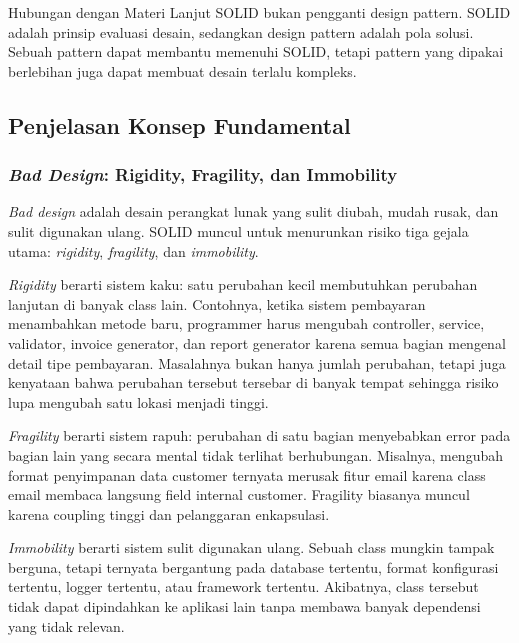 \begin{cmt}{Hubungan dengan Materi Lanjut}{}
SOLID bukan pengganti design pattern. SOLID adalah prinsip evaluasi desain, sedangkan design pattern adalah pola solusi. Sebuah pattern dapat membantu memenuhi SOLID, tetapi pattern yang dipakai berlebihan juga dapat membuat desain terlalu kompleks.
\end{cmt}

\subsection{Penjelasan Konsep Fundamental}

\subsubsection{\textit{Bad Design}: Rigidity, Fragility, dan Immobility}

\begin{jawab}
\textit{Bad design} adalah desain perangkat lunak yang sulit diubah, mudah rusak, dan sulit digunakan ulang. SOLID muncul untuk menurunkan risiko tiga gejala utama: \textit{rigidity}, \textit{fragility}, dan \textit{immobility}.
\end{jawab}

\textit{Rigidity} berarti sistem kaku: satu perubahan kecil membutuhkan perubahan lanjutan di banyak class lain. Contohnya, ketika sistem pembayaran menambahkan metode baru, programmer harus mengubah controller, service, validator, invoice generator, dan report generator karena semua bagian mengenal detail tipe pembayaran. Masalahnya bukan hanya jumlah perubahan, tetapi juga kenyataan bahwa perubahan tersebut tersebar di banyak tempat sehingga risiko lupa mengubah satu lokasi menjadi tinggi.

\textit{Fragility} berarti sistem rapuh: perubahan di satu bagian menyebabkan error pada bagian lain yang secara mental tidak terlihat berhubungan. Misalnya, mengubah format penyimpanan data customer ternyata merusak fitur email karena class email membaca langsung field internal customer. Fragility biasanya muncul karena coupling tinggi dan pelanggaran enkapsulasi.

\textit{Immobility} berarti sistem sulit digunakan ulang. Sebuah class mungkin tampak berguna, tetapi ternyata bergantung pada database tertentu, format konfigurasi tertentu, logger tertentu, atau framework tertentu. Akibatnya, class tersebut tidak dapat dipindahkan ke aplikasi lain tanpa membawa banyak dependensi yang tidak relevan.


